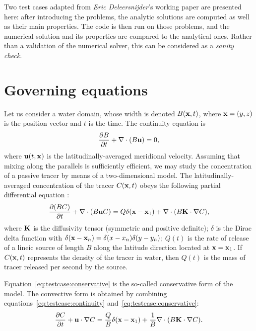 Two test cases adapted from \textit{Eric Deleersnijder}'s working paper \cite{deleersnijder2011test} are presented here: after introducing the problems, the analytic solutions are computed as well as their main properties. The code is then run on those problems, and the numerical solution and its properties are compared to the analytical ones. Rather than a validation of the numerical solver, this can be considered as a \textit{sanity check}.

\section{Governing equations}
Let us consider a water domain, whose width is denoted $B(\mathbf{x},t)$, where $\mathbf{x} = (y,z)$ is the position vector and $t$ is the time. The continuity equation is
\begin{equation} \label{eq:testcase:continuity}
	\frac{\partial B}{\partial t} + \nabla \cdot (B\mathbf{u}) = 0,
\end{equation}
where $\mathbf{u}(t,\mathbf{x})$ is the latitudinally-averaged meridional velocity. Assuming that mixing along the parallels is sufficiently efficient, we may study the concentration of a passive tracer by means of a two-dimensional model. The latitudinally-averaged concentration of the tracer $C(\mathbf x, t)$ obeys the following partial differential equation :
\begin{equation} \label{eq:testcase:conservative}
	\frac{\partial (BC)}{\partial t} + \nabla \cdot (B \mathbf{u} C) = Q\delta(\mathbf{x} - \mathbf{x}_1) + \nabla \cdot (B\mathbf{K} \cdot \nabla C), 
\end{equation}
where $\mathbf{K}$ is the diffusivity tensor (symmetric and positive definite); $\delta$ is the Dirac delta function with $\delta(\mathbf{x}-\mathbf{x}_n) = \delta(x-x_n)\delta(y-y_n)$; $Q(t)$ is the rate of release of a lineic source of length $B$ along the latitude direction located at $\mathbf{x} = \mathbf{x}_1$. If $C(\mathbf x,t)$ represents the 
density of the tracer in water, then $Q(t)$ is the mass of tracer released per second by the source.

Equation~\eqref{eq:testcase:conservative} is the so-called conservative form of the model. The convective form is obtained by combining equations~\eqref{eq:testcase:continuity} and~\eqref{eq:testcase:conservative}:
\begin{equation}  \label{eq:testcase:convective}
	\frac{\partial C}{\partial t} + \mathbf{u} \cdot \nabla C = \frac{Q}{B} \delta(\mathbf{x} - \mathbf{x}_1) + \frac{1}{B} \nabla \cdot (B\mathbf{K} \cdot \nabla C).
\end{equation}

